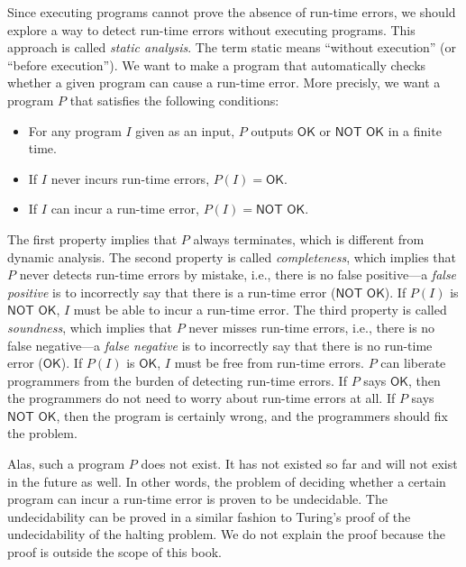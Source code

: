 Since executing programs cannot prove the absence of run-time errors, we should
explore a way to detect run-time errors without executing programs. This
approach is called \textit{static analysis}. The term
static means ``without execution'' (or ``before execution''). We want to make
a program that automatically checks whether a given program can cause a run-time
error.
More precisly, we want a program $P$ that satisfies the following conditions:
\begin{itemize}
  \item For any program $I$ given as an input, $P$ outputs $\textsf{OK}$ or
    $\textsf{NOT OK}$ in a finite time.
  \item If $I$ never incurs run-time errors,
    $P(I)=\textsf{OK}$.
  \item If $I$ can incur a run-time error, $P(I)=\textsf{NOT OK}$.
\end{itemize}
The first property implies that $P$ always terminates, which is different from
dynamic analysis.
The second property is called \textit{completeness},
which implies that $P$ never detects run-time errors by mistake, i.e., there is
no false positive---a \textit{false positive}
is to incorrectly say that there is a run-time error ($\textsf{NOT OK}$).
If $P(I)$ is $\textsf{NOT OK}$, $I$ must be able to incur a run-time
error.
The third property is called \textit{soundness},
which implies that $P$ never misses run-time errors, i.e., there is no false
negative---a \textit{false negative}
is to incorrectly say that there is no run-time error ($\textsf{OK}$).
If $P(I)$ is $\textsf{OK}$, $I$ must be free from run-time
errors.
$P$ can liberate programmers from the burden of detecting run-time errors.
If $P$ says $\textsf{OK}$, then the programmers do not need to worry about run-time
errors at all. If $P$ says $\textsf{NOT OK}$, then the program is certainly wrong, and
the programmers should fix the problem.

Alas, such a program $P$ does not exist. It has not existed so far and will
not exist in the future as well. In other words, the problem of deciding whether
a certain program can incur a run-time error is proven to be undecidable. The
undecidability can be proved in a similar fashion to Turing's proof of the
undecidability of the halting problem. We do not explain the proof because the proof
is outside the scope of this book.

